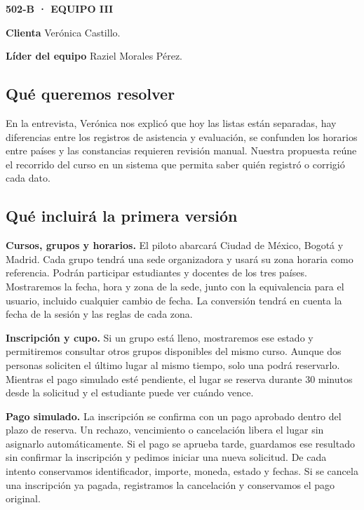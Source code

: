 \documentclass[11pt,letterpaper]{article}
\newcommand{\apartado}[1]{\subsection*{\textcolor{azul}{#1}}}
\begin{document}
\noindent\colorbox{fondo}{\parbox{\dimexpr\linewidth-2\fboxsep\relax}{%
\vspace{8pt}\hspace{8pt}\textcolor{azul}{\small\bfseries 502-B · EQUIPO III}\par
\hspace{8pt}{\LARGE\bfseries\textcolor{tinta}{Acta de alcance}}\par
\hspace{8pt}{\large Red Aprende Internacional}\par
\hspace{8pt}{\small Versión 1.1 · 3 de noviembre de 2026 · Alcance aceptado}\par\vspace{8pt}}}
\medskip

\textbf{Clienta} Verónica Castillo.\par
\textbf{Líder del equipo} Raziel Morales Pérez.

\apartado{Qué queremos resolver}
En la entrevista, Verónica nos explicó que hoy las listas están separadas, hay diferencias entre los registros de asistencia y evaluación, se confunden los horarios entre países y las constancias requieren revisión manual. Nuestra propuesta reúne el recorrido del curso en un sistema que permita saber quién registró o corrigió cada dato.

\apartado{Qué incluirá la primera versión}
\textbf{Cursos, grupos y horarios.} El piloto abarcará Ciudad de México, Bogotá y Madrid. Cada grupo tendrá una sede organizadora y usará su zona horaria como referencia. Podrán participar estudiantes y docentes de los tres países. Mostraremos la fecha, hora y zona de la sede, junto con la equivalencia para el usuario, incluido cualquier cambio de fecha. La conversión tendrá en cuenta la fecha de la sesión y las reglas de cada zona.

\textbf{Inscripción y cupo.} Si un grupo está lleno, mostraremos ese estado y permitiremos consultar otros grupos disponibles del mismo curso. Aunque dos personas soliciten el último lugar al mismo tiempo, solo una podrá reservarlo. Mientras el pago simulado esté pendiente, el lugar se reserva durante 30 minutos desde la solicitud y el estudiante puede ver cuándo vence.

\textbf{Pago simulado.} La inscripción se confirma con un pago aprobado dentro del plazo de reserva. Un rechazo, vencimiento o cancelación libera el lugar sin asignarlo automáticamente. Si el pago se aprueba tarde, guardamos ese resultado sin confirmar la inscripción y pedimos iniciar una nueva solicitud. De cada intento conservamos identificador, importe, moneda, estado y fechas. Si se cancela una inscripción ya pagada, registramos la cancelación y conservamos el pago original.
\end{document}
